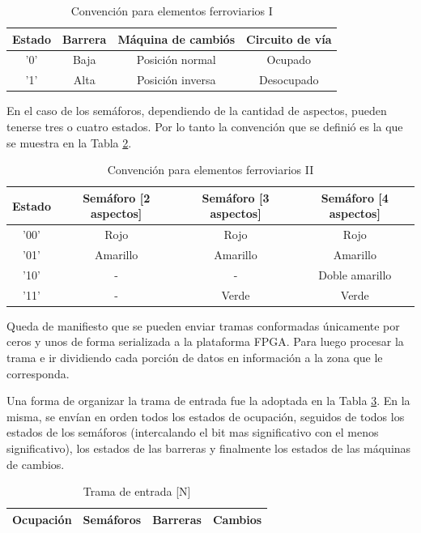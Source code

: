 	\begin{table}[!hbt]
	\renewcommand{\arraystretch}{1.3}
	\caption{Convención para elementos ferroviarios I}
	\label{Bool_1}
	\centering
	\begin{tabular}{ c  c  c  c }
	\hline	
	Estado & Barrera & Máquina de cambiós & Circuito de vía \\	
	\hline
	'0' & Baja & Posición normal & Ocupado \\	
	'1' & Alta & Posición inversa & Desocupado \\	
	\hline
	\end{tabular}
	\end{table}	
	
	En el caso de los semáforos, dependiendo de la cantidad de aspectos, pueden tenerse tres o cuatro estados. Por lo tanto la convención que se definió es la que se muestra en la Tabla \ref{Bool_2}.
	
	\begin{table}[!hbt]
	\renewcommand{\arraystretch}{1.3}
	\caption{Convención para elementos ferroviarios II}
	\label{Bool_2}
	\centering
	\begin{tabular}{ c  c  c  c }
	\hline
	Estado & Semáforo [2 aspectos] & Semáforo [3 aspectos] & Semáforo [4 aspectos] \\	
	\hline
	'00' & Rojo & Rojo & Rojo \\	
	'01' & Amarillo & Amarillo & Amarillo \\	
	'10' & - & - & Doble amarillo \\
	'11' & - & Verde & Verde \\
	\hline
	\end{tabular}
	\end{table}	
	
	Queda de manifiesto que se pueden enviar tramas conformadas únicamente por ceros y unos de forma serializada a la plataforma FPGA. Para luego procesar la trama e ir dividiendo cada porción de datos en información a la zona que le corresponda. 
	
	Una forma de organizar la trama de entrada fue la adoptada en la Tabla \ref{Trama_in}. En la misma, se envían en orden todos los estados de ocupación, seguidos de todos los estados de los semáforos (intercalando el bit mas significativo con el menos significativo), los estados de las barreras y finalmente los estados de las máquinas de cambios.
	
	\begin{table}[!hbt]
	\renewcommand{\arraystretch}{1.3}
	\caption{Trama de entrada [N]}
	\label{Trama_in}
	\centering
	\begin{tabular}{ | c | c | c | c | }
	\hline
	Ocupación & Semáforos & Barreras & Cambios \\
	\hline	
	\end{tabular}
	\end{table}		 
	
